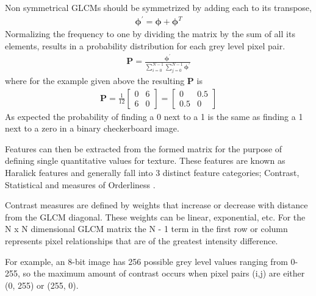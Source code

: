Non symmetrical GLCMs should be symmetrized by adding each to its transpose,
%
\begin{align}
    \mathbf{\phi}^{'} = \mathbf{\phi} + \mathbf{\phi}^{T}
\end{align}
%
Normalizing the frequency to one by dividing the matrix by the sum of all its elements, results in a probability distribution for each grey level pixel pair.
%
\begin{align}
    \mathbf{P} = \frac{\mathbf{\phi}^{'}}{\sum_{i=0}^{N-1}\sum_{j=0}^{N-1}\mathbf{\phi}^{'}}
\end{align}
%
where for the example given above the resulting $\mathbf{P}$ is
%
\begin{align}
    \mathbf{P} = \frac{1}{12}
    \begin{bmatrix}
        0 & 6 \\
        6 & 0
    \end{bmatrix}
    =
    \begin{bmatrix}
        0 & 0.5 \\
        0.5 & 0
    \end{bmatrix}
\end{align}
%
As expected the probability of finding a 0 next to a 1 is the same as finding a 1 next to a zero in a binary checkerboard image.

Features can then be extracted from the formed matrix for the purpose of defining single quantitative values for texture.  These features are known as Haralick features and generally fall into 3 distinct feature categories; Contrast, Statistical and measures of Orderliness \cite{calgary}.

Contrast measures are defined by weights that increase or decrease with distance from the GLCM diagonal.  These weights can be linear, exponential, etc. For the N x N dimensional GLCM matrix the N - 1 term in the first row or column represents pixel relationships that are of the greatest intensity difference.

For example, an 8-bit image has 256 possible grey level values ranging from 0-255, so the maximum amount of contrast occurs when pixel pairs (i,j) are either (0, 255) or (255, 0).

